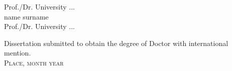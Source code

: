 \begin{titlingpage}
\begin{SingleSpace}
\begin{adjustwidth*}{-0.5cm}{0.5cm}
\begin{center}
\vspace{2mm}
Prof./Dr. University ...\\
\vspace{5mm}
name surname\\
\vspace{2mm}
Prof./Dr. University ...\\
\end{center}
\begin{center}
\vspace{-1mm}
\hspace{0cm} Dissertation submitted to obtain the degree of Doctor with international mention.\\
\vspace{5mm}
{\large\textsc{Place, month year}}
\end{center}
\end{adjustwidth*}
\vspace{12mm}
\begin{flushright}
\end{flushright}

\vspace{10cm}













\end{SingleSpace}
\end{titlingpage}
